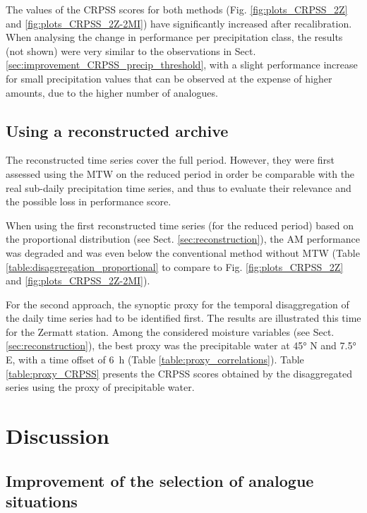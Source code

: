 \documentclass[hess, manuscript]{copernicus}
\begin{document}
	The values of the CRPSS scores for both methods (Fig. \ref{fig:plots_CRPSS_2Z} and \ref{fig:plots_CRPSS_2Z-2MI}) have significantly increased after recalibration. When analysing the change in performance per precipitation class, the results (not shown) were very similar to the observations in Sect. \ref{sec:improvement_CRPSS_precip_threshold}, with a slight performance increase for small precipitation values that can be observed at the expense of higher amounts, due to the higher number of analogues.
	
	
	\subsection{Using a reconstructed archive}
	\label{sec:reconstruction_results}
	
	The reconstructed time series cover the full period. However, they were first assessed using the MTW on the reduced period in order be comparable with the real sub-daily precipitation time series, and thus to evaluate their relevance and the possible loss in performance score. 
	
	When using the first reconstructed time series (for the reduced period) based on the proportional distribution (see Sect. \ref{sec:reconstruction}), the AM performance was degraded and was even below the conventional method without MTW (Table \ref{table:disaggregation_proportional} to compare to Fig. \ref{fig:plots_CRPSS_2Z} and \ref{fig:plots_CRPSS_2Z-2MI}).
	
	For the second approach, the synoptic proxy for the temporal disaggregation of the daily time series had to be identified first. The results are illustrated this time for the Zermatt station. Among the considered moisture variables (see Sect. \ref{sec:reconstruction}), the best proxy was the precipitable water at 45° N and 7.5° E, with a time offset of 6~h (Table \ref{table:proxy_correlations}). Table \ref{table:proxy_CRPSS} presents the CRPSS scores obtained by the disaggregated series using the proxy of precipitable water.
	
	
	\section{Discussion}
	\label{sec:discussion}
	
	
	\subsection{Improvement of the selection of analogue situations}
	
\end{document}
